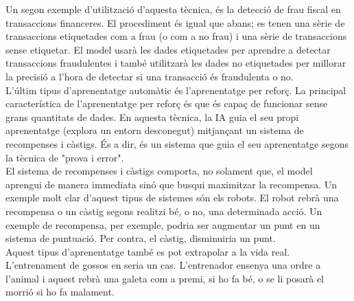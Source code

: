 \documentclass[a4paper,12pt]{report}
\begin{document}
Un segon exemple d'utilització d'aquesta tècnica, és la detecció de frau fiscal en transaccions financeres. El procediment és igual que abans; es tenen una sèrie de transaccions etiquetades com a frau (o com a no frau) i una sèrie de transaccions sense etiquetar. El model usarà les dades etiquetades per aprendre a detectar transaccions fraudulentes i també utilitzarà les dades no etiquetades per millorar la precisió a l'hora de detectar si una transacció és fraudulenta o no.\\
L'últim tipus d'aprenentatge automàtic és l'aprenentatge per reforç. La principal característica de l'aprenentatge per reforç és que és capaç de funcionar sense grans quantitats de dades. En aquesta tècnica, la IA guia el seu propi aprenentatge (explora un entorn desconegut) mitjançant un sistema de recompenses i càstigs. És a dir, és un sistema que guia el seu aprenentatge segons la tècnica de "prova i error".\\
El sistema de recompenses i càstigs comporta, no solament que, el model aprengui de manera immediata sinó que busqui maximitzar la recompensa.
Un exemple molt clar d'aquest tipus de sistemes són els robots. El robot rebrà una recompensa o un càstig segons realitzi bé, o no, una determinada acció. Un exemple de recompensa, per exemple, podria ser augmentar un punt en un sistema de puntuació. Per contra, el càstig, disminuiria un punt.\\
Aquest tipus d'aprenentatge també es pot extrapolar a la vida real. L'entrenament de gossos en seria un cas. L'entrenador ensenya una ordre a l'animal i aquest rebrà una galeta com a premi, si ho fa bé, o se li posarà el morrió si ho fa malament.
\end{document}
